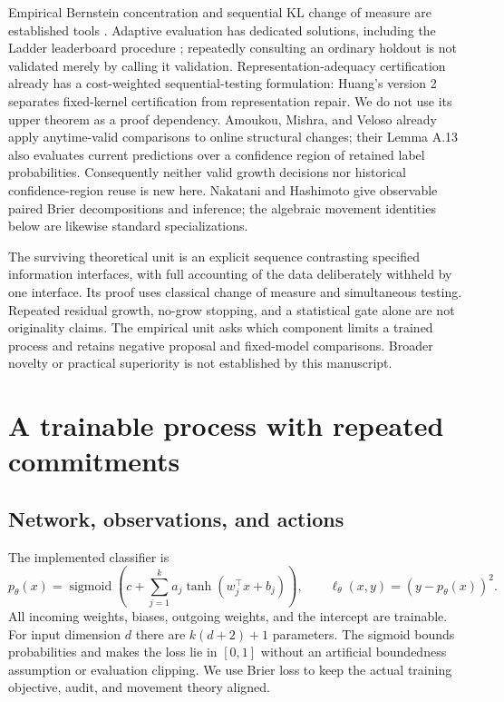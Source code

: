 \documentclass[11pt]{article}
\theoremstyle{remark}\newtheorem{remark}[theorem]{Remark}
\begin{document}
Empirical Bernstein concentration and sequential KL change of measure are
established tools \cite{maurer2009,kaufmann2016}. Adaptive evaluation has
dedicated solutions, including the Ladder leaderboard procedure
\cite{blum2015}; repeatedly consulting an ordinary holdout is not validated
merely by calling it validation. Representation-adequacy certification already has a cost-weighted
sequential-testing formulation: Huang's version 2 \cite[Theorems 8--9 and 12]{huang2026selfcertification}
separates fixed-kernel certification from representation repair. We do not
use its upper theorem as a proof dependency. Amoukou, Mishra, and Veloso
\cite[Theorem 4.1 and Appendix A.5.4]{amoukou2026} already apply anytime-valid
comparisons to online structural changes; their Lemma A.13 also evaluates
current predictions over a confidence region of retained label probabilities.
Consequently neither valid growth decisions nor historical confidence-region
reuse is new here. Nakatani and Hashimoto \cite[Proposition 1 and Section 2.10]{nakatani2026}
give observable paired Brier decompositions and inference; the algebraic
movement identities below are likewise standard specializations.

The surviving theoretical unit is an explicit sequence contrasting specified
information interfaces, with full accounting of the data deliberately
withheld by one interface. Its proof uses classical change of measure and
simultaneous testing. Repeated residual growth, no-grow stopping, and a
statistical gate alone are not originality claims. The empirical unit asks
which component limits a trained process and retains negative proposal and
fixed-model comparisons. Broader novelty or practical superiority is not
established by this manuscript.



\section{A trainable process with repeated commitments}
\label{sec:method}
\subsection{Network, observations, and actions}
The implemented classifier is
\begin{equation}
 p_\theta(x)=\operatorname{sigmoid}\!\left(c+\sum_{j=1}^k
 a_j\tanh(w_j^\top x+b_j)\right),\qquad
 \ell_\theta(x,y)=(y-p_\theta(x))^2.
 \label{eq:network}
\end{equation}
All incoming weights, biases, outgoing weights, and the intercept are
trainable. For input dimension $d$ there are $k(d+2)+1$ parameters.
The sigmoid bounds probabilities and makes the loss lie in $[0,1]$ without
an artificial boundedness assumption or evaluation clipping. We use Brier
loss to keep the actual training objective, audit, and movement theory aligned.
\end{document}
